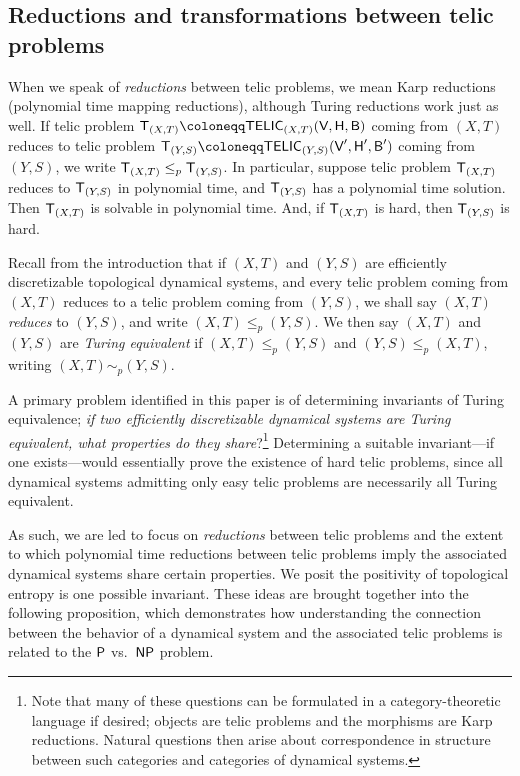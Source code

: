 \documentclass{amsart}
\theoremstyle{theorem}
\theoremstyle{remark}
\numberwithin{equation}{section}
\newcommand{\ccP}{\textsf{\upshape P}}
\newcommand{\ccNP}{\textsf{\upshape NP}}
\newcommand{\ccB}{\textsf{\upshape B}}
\newcommand{\ccT}{\textsf{\upshape T}}
\newcommand{\ccH}{\textsf{\upshape H}}
\newcommand{\ccV}{\textsf{\upshape V}}
\newcommand{\ccTELIC}{\textsf{\upshape TELIC}}
\begin{document}
\subsection{Reductions and transformations between telic problems}
When we speak of \emph{reductions} between telic problems, we mean Karp reductions (polynomial time mapping reductions), although Turing reductions work just as well.
If telic problem $\ccT_{(X, T)} \coloneqq \ccTELIC_{(X, T)}(\ccV,\ccH,\ccB)$ coming from $(X, T)$ reduces to telic problem $\ccT_{(Y, S)} \coloneqq \ccTELIC_{(Y, S)}(\ccV',\ccH',\ccB')$ coming from $(Y,S)$, we write $\ccT_{(X, T)} \leq_p \ccT_{(Y, S)}$. In particular, suppose telic problem $\ccT_{(X, T)}$ reduces to $\ccT_{(Y, S)}$ in polynomial time, and $\ccT_{(Y, S)}$ has a polynomial time solution. Then $\ccT_{(X, T)}$ is solvable in polynomial time. And, if $\ccT_{(X, T)}$ is hard, then $\ccT_{(Y, S)}$ is hard.

Recall from the introduction that if $(X, T)$ and $(Y, S)$ are efficiently discretizable topological dynamical systems, and every telic problem coming from $(X, T)$ reduces to a telic problem coming from $(Y, S)$, we shall say $(X, T)$ \emph{reduces} to $(Y, S)$, and write $(X, T)\leq_p (Y, S)$. We then say $(X, T)$ and $(Y, S)$ are \emph{Turing equivalent} if $(X, T) \leq_p (Y, S)$ and $(Y, S) \leq_p (X, T)$, writing $(X, T)\sim_p (Y,S)$.

A primary problem identified in this paper is of determining invariants of Turing equivalence; \emph{if two efficiently discretizable dynamical systems are Turing equivalent, what properties do they share}?\footnote{Note that many of these questions can be formulated in a category-theoretic language if desired; objects are telic problems and the morphisms are Karp reductions. Natural questions then arise about correspondence in structure between such categories and categories of dynamical systems.} Determining a suitable invariant---if one exists---would essentially prove the existence of hard telic problems, since all dynamical systems admitting only easy telic problems are necessarily all Turing equivalent.

As such, we are led to focus on \emph{reductions} between telic problems and the extent to which polynomial time reductions between telic problems imply the associated dynamical systems share certain properties. We posit the positivity of topological entropy is one possible invariant. These ideas are brought together into the following proposition, which demonstrates how understanding the connection between the behavior of a dynamical system and the associated telic problems is related to the $\ccP$ vs.\ $\ccNP$ problem.
\end{document}
